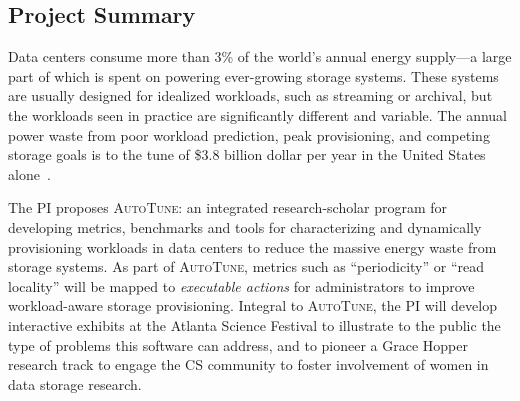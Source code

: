
\subsection*{Project Summary}


Data centers consume more than 3\% of the world's annual energy supply---a large part
of which is spent on powering ever-growing storage systems.
These systems are usually designed for idealized workloads, such as streaming or archival, but
the workloads seen in practice are significantly different and variable. 
The annual power waste from poor workload prediction, peak provisioning, and competing storage goals is to the tune of \$3.8 billion dollar per year in the United States alone~\cite{masanet,nrdc}.

\newcommand{\at}{\textsc{AutoTune}}

The PI proposes \at{}: an integrated research-scholar program 
for developing metrics, benchmarks and tools for characterizing and dynamically provisioning workloads in data centers to reduce the massive energy waste from storage systems. 
As part of \at{}, metrics such as ``periodicity'' or ``read locality'' will be
mapped to \textit{executable actions} for administrators to improve workload-aware
storage provisioning. Integral to \at{}, the PI will develop interactive exhibits at the Atlanta Science Festival to illustrate to the public the type of problems this software can address, and to pioneer a Grace Hopper research track to engage the CS community to foster involvement of women in data storage research.

